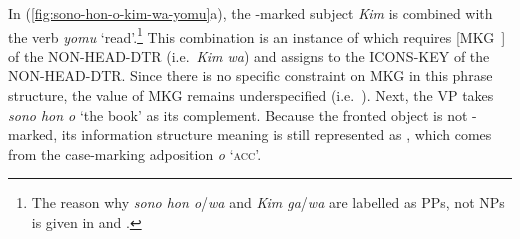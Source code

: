 \noindent In (\ref{fig:sono-hon-o-kim-wa-yomu}a), the \wa-marked
subject \textit{Kim} is combined with the verb \textit{yomu}
`read'.\footnote{The reason why \textit{sono hon o}/\textit{wa} and
  \textit{Kim ga}/\textit{wa} are labelled as PPs, not NPs is given in
  \citet{yatabe:99} and \citet{siegel:99}.} This combination is an
instance of  which requires \mbox{[MKG
    ]} of the NON-HEAD-DTR (i.e.\ \textit{Kim wa}) and assigns
 to the ICONS-KEY of the NON-HEAD-DTR. Since there
is no specific constraint on MKG in this phrase structure, the value
of MKG remains underspecified
(i.e.\ ). Next, the VP takes
\textit{sono hon o} `the book' as its complement. Because the fronted
object is not \wa-marked, its information structure meaning is still
represented as , which comes from the case-marking
adposition \textit{o} `\textsc{acc}'.



